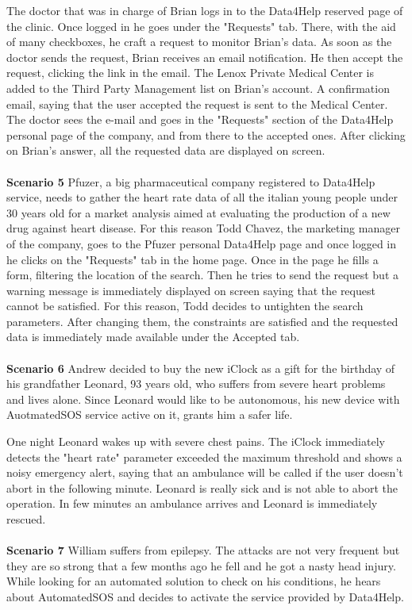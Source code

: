 The doctor that was in charge of Brian logs in to the Data4Help reserved page of the clinic. Once logged in he goes under the "Requests" tab. There, with the aid of many checkboxes, he craft a request to monitor Brian's data.
As soon as the doctor sends the request, Brian receives an email notification. He then accept the request, clicking the link in the email. The Lenox Private Medical Center is added to the Third Party Management list on Brian's account. A confirmation email, saying that the user accepted the request is sent to the Medical Center. 
The doctor sees the e-mail and goes in the "Requests" section of the Data4Help personal page of the company, and from there to the accepted ones. After clicking on Brian's answer, all the requested data are displayed on screen.
\\
\\
\textbf{Scenario 5}
Pfuzer, a big pharmaceutical company registered to Data4Help service, needs to gather the heart rate data of all the italian young people under 30 years old for a market analysis aimed at evaluating the production of a new drug against heart disease. For this reason Todd Chavez, the marketing manager of the company, goes to the Pfuzer personal Data4Help page and once logged  in he clicks on the "Requests" tab in the home page. Once in the page he fills a form, filtering the location of the search. Then he tries to send the request but a warning message is immediately displayed on screen saying that the request cannot be satisfied. For this reason, Todd decides to untighten the search parameters. After changing them, the constraints are satisfied and the requested data is immediately made available under the Accepted tab.
\\
\\
\textbf{Scenario 6}
Andrew decided to buy the new iClock as a gift for the birthday of his grandfather Leonard, 93
years old, who suffers from severe heart problems and lives alone. Since Leonard would like to be autonomous, his new device with AuotmatedSOS service active on it, grants him a safer life.

One night Leonard wakes up with severe chest pains. The iClock immediately detects the "heart rate" parameter exceeded the maximum threshold and shows a noisy emergency alert, saying that an ambulance will be called if the user doesn't abort in the following minute. Leonard is really sick and is not able to abort the operation. In few minutes an ambulance arrives and Leonard is immediately rescued.
\\
\\
\textbf{Scenario 7}
William suffers from epilepsy. The attacks are not very frequent but they are so strong that a few months ago he fell and he got a nasty head injury. While looking for an automated solution to check on his conditions, he hears about AutomatedSOS and decides to activate the service provided by Data4Help.

